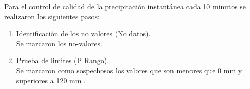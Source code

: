 
Para el control de calidad de la precipitación instantánea cada 10 minutos se realizaron los siguientes pasos:

\begin{enumerate}
\item Identificación de los no valores (No datos).\\
Se marcaron los no-valores.
\item Prueba de limites (P Rango).\\
Se marcaron como sospechosos los valores que son menores que 0 mm y superiores a 120 mm \citep{estevez2011}.

\end{enumerate}


